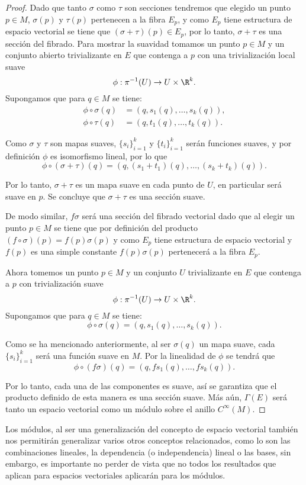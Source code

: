 \begin{proof}
	Dado que tanto $\sigma$ como $\tau$ son secciones tendremos que elegido un punto $p \in M$, $\sigma(p)$ y $\tau(p)$ pertenecen a la fibra $E_p$, y como $E_p$ tiene estructura de espacio vectorial se tiene que $(\sigma + \tau)(p) \in E_p$, por lo tanto, $\sigma + \tau$ es una sección del fibrado. Para mostrar la suavidad tomamos un punto $p \in M$ y un conjunto abierto trivializante en $E$ que contenga a $p$ con una trivialización local suave
	\[
		\phi: \pi^{-1}(U) \to U \times \R^k.
	\]
	Supongamos que para $q \in M$ se tiene:
	\begin{align*}
		\phi \circ \sigma(q) & = (q, s_1(q), \dots, s_k(q)), \\
		\phi \circ \tau(q)   & = (q, t_1(q), \dots, t_k(q)).
	\end{align*}

	Como $\sigma$ y $\tau$ son mapas suaves, $\{s_i\}_{i=1}^k$ y  $\{t_i\}_{i=1}^k$ serán funciones suaves, y por definición $\phi$ es isomorfismo lineal, por lo que
	\[
		\phi \circ (\sigma + \tau)(q) = (q, (s_1 + t_1)(q), \dots, (s_k + t_k)(q)).
	\]

	Por lo tanto, $\sigma + \tau$ es un mapa suave en cada punto de $U$, en particular será suave en $p$. Se concluye que $\sigma + \tau$ es una sección suave.

	De modo similar, $f\sigma$ será una sección del fibrado vectorial dado que al elegir un punto $p \in M$ se tiene que por definición del producto $(f \circ \sigma)(p) = f(p)\sigma(p)$ y como $E_p$ tiene estructura de espacio vectorial y $f(p)$ es una simple constante $f(p)\sigma(p)$ pertenecerá a la fibra $E_p$.

	Ahora tomemos un punto $p \in M$ y un conjunto $U$ trivializante en $E$ que contenga a $p$ con trivialización suave
	\[
		\phi: \pi^{-1}(U) \to U \times \R^{k}.
	\]
	Supongamos que para $q \in M$ se tiene:
	\[
		\phi \circ \sigma(q) = (q, s_1(q), \dots, s_k(q)).
	\]

	Como se ha mencionado anteriormente, al ser $\sigma(q)$ un mapa suave, cada $\{s_i\}_{i=1}^k$ será una función suave en $M$. Por la linealidad de $\phi$ se tendrá que
	\[
		\phi \circ (f \sigma)(q) = (q, fs_1(q),\dots, fs_k(q)).
	\]

	Por lo tanto, cada una de las componentes es suave, así se garantiza que el producto definido de esta manera es una sección suave. Más aún, $\Gamma(E)$ será tanto un espacio vectorial como un módulo sobre el anillo $C^{\infty}(M)$.
\end{proof}

Los módulos, al ser una generalización del concepto de espacio vectorial también nos permitirán generalizar varios otros conceptos relacionados, como lo son las combinaciones lineales, la dependencia (o independencia) lineal o las bases, sin embargo, es importante no perder de vista que no todos los resultados que aplican para espacios vectoriales aplicarán para los módulos.
